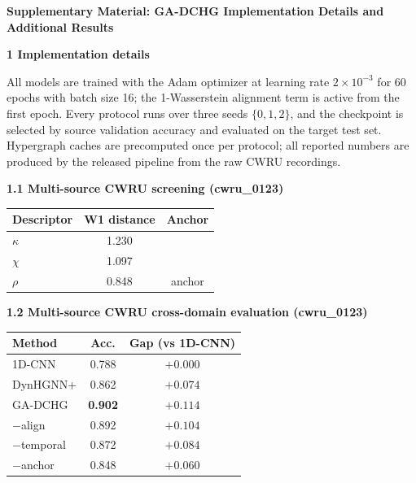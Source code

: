\documentclass[10pt]{article}
\begin{document}
\begin{center}
{\large\bf Supplementary Material: GA-DCHG Implementation Details and Additional Results}
\end{center}

\vspace{1em}

\noindent\textbf{1 Implementation details}

All models are trained with the Adam optimizer at learning rate $2\times10^{-3}$ for 60 epochs with batch size 16; the 1-Wasserstein alignment term is active from the first epoch. Every protocol runs over three seeds $\{0,1,2\}$, and the checkpoint is selected by source validation accuracy and evaluated on the target test set. Hypergraph caches are precomputed once per protocol; all reported numbers are produced by the released pipeline from the raw CWRU recordings.

\vspace{0.5em}

\noindent\textbf{1.1 Multi-source CWRU screening (cwru\_0123)}

\begin{table}[h]
\centering
\begin{tabular}{lcc}
\toprule
Descriptor & W1 distance & Anchor \\
\midrule
$\kappa$ & 1.230 & \\
$\chi$   & 1.097 & \\
$\rho$   & 0.848 & anchor \\
\bottomrule
\end{tabular}
\end{table}

\vspace{0.5em}

\noindent\textbf{1.2 Multi-source CWRU cross-domain evaluation (cwru\_0123)}

\begin{table}[h]
\centering
\begin{tabular}{lcc}
\toprule
Method & Acc. & Gap (vs 1D-CNN) \\
\midrule
1D-CNN            & 0.788 & $+0.000$ \\
DynHGNN+          & 0.862 & $+0.074$ \\
GA-DCHG           & \textbf{0.902} & $\mathbf{+0.114}$ \\
\hspace{1em}$-$align      & 0.892 & $+0.104$ \\
\hspace{1em}$-$temporal   & 0.872 & $+0.084$ \\
\hspace{1em}$-$anchor     & 0.848 & $+0.060$ \\
\bottomrule
\end{tabular}
\end{table}
\end{document}
